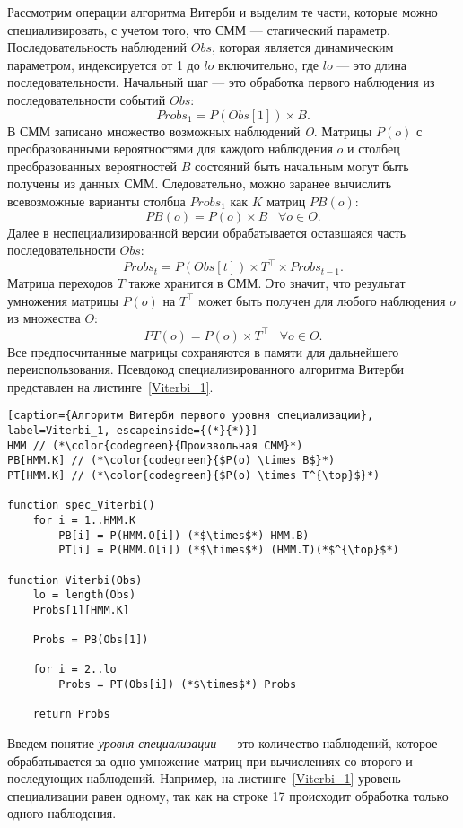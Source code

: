 Рассмотрим операции алгоритма Витерби и выделим те части, которые можно специализировать, с учетом того, что 
СММ --- статический параметр.
Последовательность наблюдений $Obs$, которая является 
динамическим параметром, индексируется от 1 до $lo$ 
включительно, где $lo$ --- это длина последовательности.
Начальный шаг --- это обработка первого наблюдения из 
последовательности событий $Obs$:
\[Probs_{1} = P(Obs[1]) \times B.\]
В СММ записано множество возможных наблюдений \emph{O}.
Матрицы $P(o)$ с преобразованными вероятностями для каждого 
наблюдения $o$ и столбец преобразованных вероятностей 
$B$ состояний быть начальным могут быть
получены из данных СММ.
Следовательно, можно заранее вычислить всевозможные варианты 
столбца $Probs_{1}$ как $K$ матриц $PB(o)$: 
\[PB(o) = P(o) \times B \;\;\; \forall o \in O.\]
Далее в неспециализированной версии обрабатывается оставшаяся 
часть последовательности $Obs$:
\[Probs_{t} = P(Obs[t]) \times T^{\top} \times Probs_{t - 1}.\]
Матрица переходов $T$ также хранится в СММ.
Это значит, что результат умножения матрицы $P(o)$ на 
$T^{\top}$ может быть получен для любого наблюдения $o$ из 
множества $O$:
\[PT(o) = P(o) \times T^{\top} \;\;\; \forall o \in O.\]
Все предпосчитанные матрицы сохраняются в памяти для 
дальнейшего переиспользования.
Псевдокод специализированного алгоритма Витерби представлен 
на листинге~\ref{Viterbi_1}.
\begin{lstlisting}[caption={Алгоритм Витерби первого уровня специализации}, label=Viterbi_1, escapeinside={(*}{*)}]
HMM // (*\color{codegreen}{Произвольная СММ}*)
PB[HMM.K] // (*\color{codegreen}{$P(o) \times B$}*)
PT[HMM.K] // (*\color{codegreen}{$P(o) \times T^{\top}$}*)

function spec_Viterbi()
	for i = 1..HMM.K
		PB[i] = P(HMM.O[i]) (*$\times$*) HMM.B)
		PT[i] = P(HMM.O[i]) (*$\times$*) (HMM.T)(*$^{\top}$*)

function Viterbi(Obs)
	lo = length(Obs)
	Probs[1][HMM.K]

	Probs = PB(Obs[1])
	
	for i = 2..lo
		Probs = PT(Obs[i]) (*$\times$*) Probs
		
	return Probs
\end{lstlisting}

Введем понятие \emph{уровня специализации} --- это количество 
наблюдений, которое обрабатывается за одно умножение матриц 
при вычислениях со второго и последующих наблюдений.
Например, на листинге~\ref{Viterbi_1} уровень специализации 
равен одному, так как на строке 17 происходит обработка 
только одного наблюдения.

